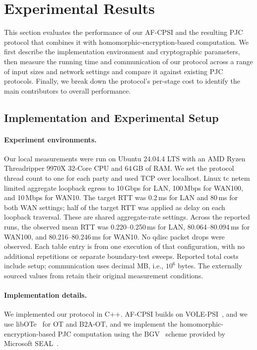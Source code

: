 \section{Experimental Results}
\label{sec:experimental-results}
This section evaluates the performance of our AF-CPSI and the resulting
PJC protocol that combines it with homomorphic-encryption-based
computation. We first describe the implementation environment and
cryptographic parameters, then measure the running time and communication
of our protocol across a range of input sizes and network settings and
compare it against existing PJC protocols. Finally, we break down the
protocol's per-stage cost to identify the main contributors to overall
performance.



\subsection{Implementation and Experimental Setup}
\label{sec:experimental-setup}

\paragraph{Experiment environments.}
Our local measurements were run on Ubuntu 24.04.4 LTS with an AMD Ryzen
Threadripper 9970X 32-Core CPU and 64\,GB of RAM. We set the protocol
thread count to one for each party and used TCP over localhost. Linux
\textsf{tc netem} limited aggregate loopback egress to 10\,Gbps for LAN,
100\,Mbps for WAN100, and 10\,Mbps for WAN10. The target RTT was
0.2\,ms for LAN and 80\,ms for both WAN settings; half of the target RTT
was applied as delay on each loopback traversal. These are shared
aggregate-rate settings. Across the reported runs, the observed mean RTT
was 0.220--0.250\,ms for LAN, 80.064--80.094\,ms for WAN100, and
80.216--80.246\,ms for WAN10. No qdisc packet drops were observed.
Each table entry is from one execution of that configuration, with no
additional repetitions or separate boundary-test sweeps. Reported total
costs include setup; communication uses decimal MB, i.e., $10^6$ bytes.
The externally sourced values from \cite{CHI+23} retain their original
measurement conditions.

\medskip
\paragraph{Implementation details.}
We implemented our protocol in C++. AF-CPSI builds on \textsf{VOLE-PSI}~\cite{volepsi},
and we use \textsf{libOTe}~\cite{libOTe} for OT and B2A-OT, and we implement the homomorphic-encryption-based PJC
computation using the BGV~\cite{BGV14} scheme provided by Microsoft SEAL~\cite{SEAL}.

